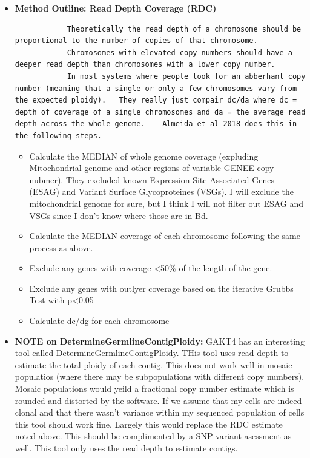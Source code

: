 \documentclass{article}
\begin{document}
\begin{itemize}
        \item \textbf{Method Outline: Read Depth Coverage (RDC)}
        \begin{verbatim}
            Theoretically the read depth of a chromosome should be proportional to the number of copies of that chromosome.
            Chromosomes with elevated copy numbers should have a deeper read depth than chromosomes with a lower copy number.
            In most systems where people look for an abberhant copy number (meaning that a single or only a few chromosomes vary from the expected ploidy).   They really just compair dc/da where dc = depth of coverage of a single chromosomes and da = the average read depth across the whole genome.    Almeida et al 2018 does this in the following steps.
        \end{verbatim}
        \begin{itemize}
            \item Calculate the MEDIAN of whole genome coverage (expluding Mitochondrial genome and other regions of variable GENEE copy nubmer).   They excluded known Expression Site Associated Genes (ESAG) and Variant Surface Glycoproteines (VSGs).   I will exclude the mitochondrial genome for sure, but I think I will not filter out ESAG and VSGs since I don't know where those are in Bd.
            \item Calculate the MEDIAN coverage of each chromosome following the same process as above.
            \item Exclude any genes with coverage <50\% of the length of the gene.
            \item Exclude any genes with outlyer coverage based on the iterative Grubbs Test with p<0.05
            \item Calculate dc/dg for each chromosome
        \end{itemize}

        \item \textbf{NOTE on DetermineGermlineContigPloidy:} GAKT4 has an interesting tool called DetermineGermlineContigPloidy.  THis tool uses read depth to estimate the total ploidy of each contig.   This does not work well in mosaic populatios (where there may be subpopulations with different copy numbers).  Mosaic populations would yeild a fractional copy number estimate which is rounded and distorted by the software.   If we assume that my cells are indeed clonal and that there wasn't variance within my sequenced population of cells this tool should work fine.   Largely this would replace the RDC estimate noted above.   This should be complimented by a SNP variant asessment as well.   This tool only uses the read depth to estimate contigs.
        

\end{itemize}
\end{document}
